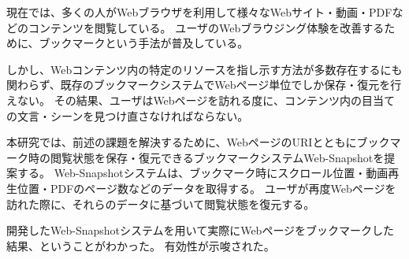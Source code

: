 \begin{jabstract}

  現在では、多くの人がWebブラウザを利用して様々なWebサイト・動画・PDFなどのコンテンツを閲覧している。
  ユーザのWebブラウジング体験を改善するために、ブックマークという手法が普及している。

  しかし、Webコンテンツ内の特定のリソースを指し示す方法が多数存在するにも関わらず、既存のブックマークシステムでWebページ単位でしか保存・復元を行えない。
  その結果、ユーザはWebページを訪れる度に、コンテンツ内の目当ての文言・シーンを見つけ直さなければならない。

  本研究では、前述の課題を解決するために、WebページのURIとともにブックマーク時の閲覧状態を保存・復元できるブックマークシステムWeb-Snapshotを提案する。
  Web-Snapshotシステムは、ブックマーク時にスクロール位置・動画再生位置・PDFのページ数などのデータを取得する。
  ユーザが再度Webページを訪れた際に、それらのデータに基づいて閲覧状態を復元する。

  開発したWeb-Snapshotシステムを用いて実際にWebページをブックマークした結果、ということがわかった。
  有効性が示唆された。

\end{jabstract}
